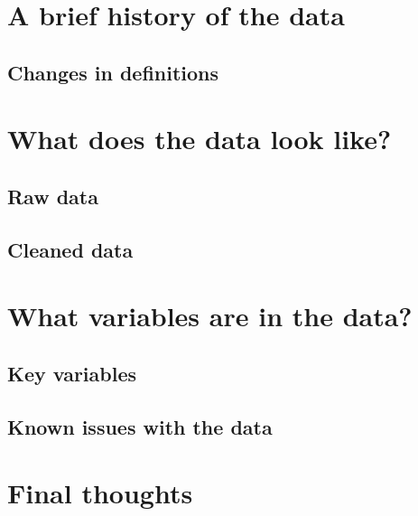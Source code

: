 \documentclass[
  12pt,
  openany]{book}
\begin{document}
\hypertarget{a-brief-history-of-the-data-1}{%
\section{A brief history of the data}\label{a-brief-history-of-the-data-1}}

\hypertarget{changes-in-definitions-1}{%
\subsection{Changes in definitions}\label{changes-in-definitions-1}}

\hypertarget{what-does-the-data-look-like-1}{%
\section{What does the data look like?}\label{what-does-the-data-look-like-1}}

\hypertarget{raw-data-1}{%
\subsection{Raw data}\label{raw-data-1}}

\hypertarget{cleaned-data-1}{%
\subsection{Cleaned data}\label{cleaned-data-1}}

\hypertarget{what-variables-are-in-the-data-1}{%
\section{What variables are in the data?}\label{what-variables-are-in-the-data-1}}

\hypertarget{key-variables-1}{%
\subsection{Key variables}\label{key-variables-1}}

\hypertarget{known-issues-with-the-data-1}{%
\subsection{Known issues with the data}\label{known-issues-with-the-data-1}}

\hypertarget{final-thoughts-1}{%
\section{Final thoughts}\label{final-thoughts-1}}
\end{document}
